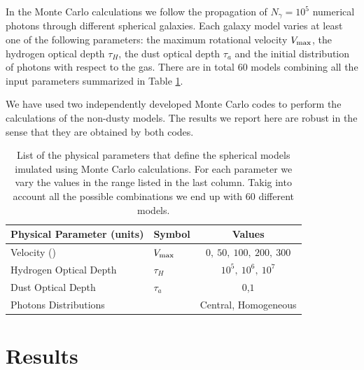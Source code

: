 \documentclass[usenatbib]{mn2e}
\newcommand{\kms}{{\ifmmode{{\mathrm{\,km\ s}^{-1}}}\else{\,km~s$^{-1}$}\fi}}
\begin{document}
In the Monte Carlo calculations we follow the propagation of $N_{\gamma}=10^5$
numerical photons through different spherical galaxies. Each galaxy
model varies at least one of the following parameters: the maximum
rotational velocity $V_{\rm max}$, the hydrogen optical depth $\tau_{H}$,
the dust optical depth $\tau_{a}$ and the initial distribution of photons
with respect to the gas. There are in total 60 models combining all
the input parameters summarized in Table \ref{table:models}. 


We have used two independently developed Monte Carlo codes
\citep{CLARA,DijkstraKramer} to perform the calculations of the
non-dusty models. The results we report here are robust in the sense
that they are obtained by both codes.

\begin{table}
\begin{center}
\begin{tabular}{llc}\hline\hline
Physical Parameter (units) & Symbol & Values\\\hline
Velocity (\kms) & $V_{\rm max}$&$0,\ 50,\ 100,\ 200,\ 300$\\
Hydrogen Optical Depth & $\tau_{H} $ & $10^{5},\ 10^{6},\ 10^{7}$\\
Dust Optical Depth & $\tau_{a}$ & $0$,$1$\\
Photons Distributions & & Central, Homogeneous\\\hline\hline
\end{tabular}
\caption{
  List of the physical parameters that define the spherical models 
  imulated using Monte Carlo calculations. For each parameter we
  vary the values in the range listed in the last column. Takig into
  account all the possible combinations we end up with $60$ different
  models. } 
\label{table:models}
\end{center}
\end{table}


\section{Results}
\label{sec:results}
\end{document}
